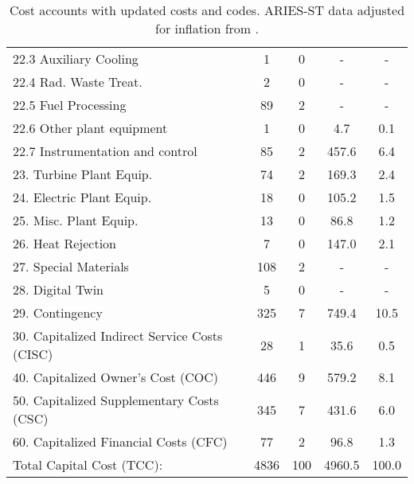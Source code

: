 \begin{table}[h!]
{\begin{tabular}{lcccc}
\hspace{10mm}22.3 Auxiliary Cooling & 1 & 0 & - & - \\
\hspace{10mm}22.4 Rad. Waste Treat. & 2 & 0 & - & - \\
\hspace{10mm}22.5 Fuel Processing & 89 & 2 & - & - \\
\hspace{10mm}22.6 Other plant equipment & 1 & 0 & 4.7 & 0.1 \\
\hspace{10mm}22.7 Instrumentation and control & 85 & 2 & 457.6 & 6.4 \\
\hspace{5mm}23. Turbine Plant Equip. & 74 & 2 & 169.3 & 2.4 \\
\hspace{5mm}24. Electric Plant Equip. & 18 & 0 & 105.2 & 1.5 \\
\hspace{5mm}25. Misc. Plant Equip. & 13 & 0 & 86.8 & 1.2 \\
\hspace{5mm}26. Heat Rejection & 7 & 0 & 147.0 & 2.1 \\
\hspace{5mm}27. Special Materials & 108 & 2 & - & - \\
\hspace{5mm}28. Digital Twin & 5 & 0 & - & - \\
\hspace{5mm}29. Contingency & 325 & 7 & 749.4 & 10.5 \\
30. Capitalized Indirect Service Costs (CISC) & 28 & 1 & 35.6 & 0.5 \\
40. Capitalized Owner’s Cost (COC) & 446 & 9 & 579.2 & 8.1 \\
50. Capitalized Supplementary Costs (CSC) & 345 & 7 & 431.6 & 6.0 \\
60. Capitalized Financial Costs (CFC) & 77 & 2 & 96.8 & 1.3 \\
\hline
Total Capital Cost (TCC): & 4836 & 100 & 4960.5 & 100.0 \\
\hline
\end{tabular}
}
\caption{Cost accounts with updated costs and codes. ARIES-ST data adjusted for inflation from \cite{gordon1986mirror}.}
\label{tab:costs_updated_codes}
\end{table}


